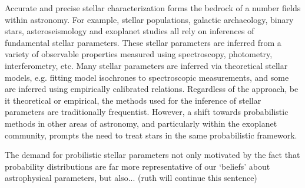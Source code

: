 


Accurate and precise stellar characterization forms the bedrock of a number
fields within astronomy.
For example, stellar populations, galactic archaeology, binary stars,
asteroseismology and exoplanet studies all rely on inferences of fundamental
stellar parameters.
These stellar parameters are inferred from a variety of observable properties
measured using spectroscopy, photometry, interferometry, etc.
Many stellar parameters are inferred via theoretical stellar models, e.g.
fitting model isochrones to spectroscopic measurements, and
some are inferred using empirically calibrated relations.
Regardless of the approach, be it theoretical or empirical, the methods used
for the inference of stellar parameters are traditionally frequentist.
However, a shift towards probabilistic methods in other areas of astronomy,
and particularly within the exoplanet community, prompts the need to treat
stars in the same probabilistic framework.

The demand for probilistic stellar parameters not only motivated by the fact
that probability distributions are far more representative of our `beliefs'
about astrophysical parameters, but also... (ruth will continue this sentence)

